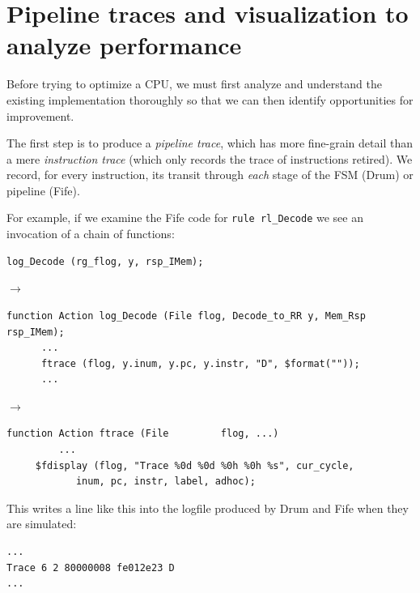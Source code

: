 
\section{Pipeline traces and visualization to analyze performance}

Before trying to optimize a CPU, we must first analyze and understand
the existing implementation thoroughly so that we can then identify
opportunities for improvement.


The first step is to produce a \emph{pipeline trace}, which has more
fine-grain detail than a mere \emph{instruction trace} (which only
records the trace of instructions retired).  We record, for every
instruction, its transit through \emph{each} stage of the FSM (Drum)
or pipeline (Fife).

For example, if we examine the Fife code for \verb|rule rl_Decode| we
see an invocation of a chain of functions:

{\small
\begin{Verbatim}[frame=single, label=src\_Fife/S2\_Decode.bsv]
      log_Decode (rg_flog, y, rsp_IMem);
\end{Verbatim}
}

$\longrightarrow$

{\small
\begin{Verbatim}[frame=single, label=src\_Common/Fn\_Decode.bsv]
   function Action log_Decode (File flog, Decode_to_RR y, Mem_Rsp rsp_IMem);
      ...
      ftrace (flog, y.inum, y.pc, y.instr, "D", $format(""));
      ...
\end{Verbatim}
}

$\longrightarrow$

{\small
\begin{Verbatim}[frame=single, label=src\_Common/Utils.bsv]
function Action ftrace (File         flog, ...)
         ...
	 $fdisplay (flog, "Trace %0d %0d %0h %0h %s", cur_cycle,
		    inum, pc, instr, label, adhoc);
\end{Verbatim}
}

This writes a line like this into the logfile produced by Drum and
Fife when they are simulated:

{\small
\begin{Verbatim}[frame=single, label=log.txt]
...
Trace 6 2 80000008 fe012e23 D
...
\end{Verbatim}
}

